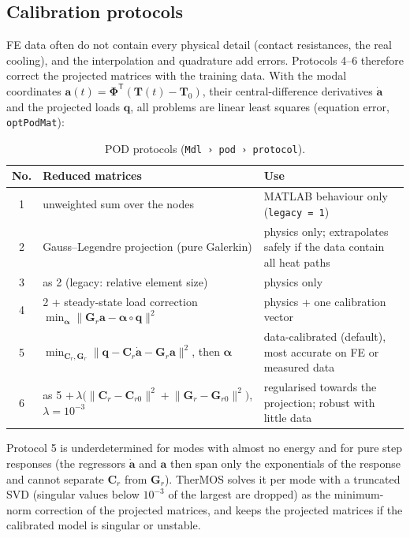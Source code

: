 \documentclass[11pt,a4paper]{article}
\newcommand{\T}{^{\mathsf T}}
\newcommand{\mat}[1]{\bm{#1}}
\newcommand{\cfg}[1]{\texttt{#1}}
\begin{document}
\subsection{Calibration protocols}
FE data often do not contain every physical detail (contact resistances, the real cooling), and the interpolation and
quadrature add errors. Protocols 4--6 therefore correct the projected matrices with the training data. With the
modal coordinates $\bm a(t)=\bm\Phi\T(\bm T(t)-\bm T_0)$, their central-difference derivatives $\dot{\bm a}$ and the
projected loads $\bm q$, all problems are linear least squares (equation error, \texttt{optPodMat}):

\begin{table}[h]\centering\small
\caption{POD protocols (\cfg{Mdl › pod › protocol}).}\label{tab:protocols}
\begin{tabularx}{\linewidth}{@{}clX@{}}\toprule
No. & Reduced matrices & Use \\\midrule
1 & unweighted sum over the nodes & MATLAB behaviour only (\cfg{legacy = 1}) \\
2 & Gauss--Legendre projection (pure Galerkin) & physics only; extrapolates safely if the data contain all heat paths \\
3 & as 2 (legacy: relative element size) & physics only \\
4 & 2 + steady-state load correction $\min_{\bm\alpha}\lVert\mat G_r\bm a-\bm\alpha\circ\bm q\rVert^2$ & physics + one calibration vector \\
5 & $\min_{\mat C_r,\mat G_r}\lVert\bm q-\mat C_r\dot{\bm a}-\mat G_r\bm a\rVert^2$, then $\bm\alpha$ & data-calibrated (default), most accurate on FE or measured data \\
6 & as 5 $+\,\lambda\bigl(\lVert\mat C_r-\mat C_{r0}\rVert^2+\lVert\mat G_r-\mat G_{r0}\rVert^2\bigr)$, $\lambda=10^{-3}$ & regularised towards the projection; robust with little data \\\bottomrule
\end{tabularx}
\end{table}

Protocol 5 is underdetermined for modes with almost no energy and for pure step responses (the regressors
$\dot{\bm a}$ and $\bm a$ then span only the exponentials of the response and cannot separate $\mat C_r$ from
$\mat G_r$). TherMOS solves it per mode with a truncated SVD (singular values below $10^{-3}$ of the largest are
dropped) as the minimum-norm correction of the projected matrices, and keeps the projected matrices if the calibrated
model is singular or unstable.
\end{document}
